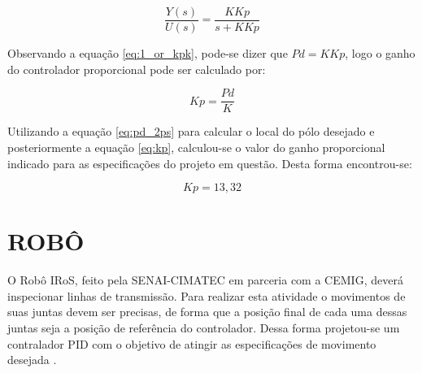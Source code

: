 \documentclass[12pt,oneside,a4paper, chapter=TITLE, section = TITLE, english, brazil]{abntex2}
\begin{document}
\begin{equation}
\frac{Y(s)}{U(s)} = \frac{K Kp}{s + K Kp} \label{eq:1_or_kpk}
\end{equation}

Observando a equação \ref{eq:1_or_kpk}, pode-se dizer que $Pd = KKp$, logo o ganho do controlador proporcional pode ser calculado por:

\begin{equation}
Kp = \frac{Pd}{K} \label{eq:kp}
\end{equation}

Utilizando a equação \ref{eq:pd_2ps} para calcular o local do pólo desejado e posteriormente a equação \ref{eq:kp}, calculou-se o valor do ganho proporcional indicado para as especificações do projeto em questão. Desta forma encontrou-se:

$$Kp = 13,32$$ 





\section{ROBÔ} \label{sec:rob_cemig}

O Robô IRoS, feito pela SENAI-CIMATEC em parceria com a CEMIG, deverá inspecionar linhas de transmissão. Para realizar esta atividade o movimentos de suas juntas devem ser precisas, de forma que a posição final de cada uma dessas juntas seja a posição de referência do controlador. Dessa forma projetou-se um contralador PID com o objetivo de atingir as especificações de movimento desejada \cite{cemig}.
\end{document}
